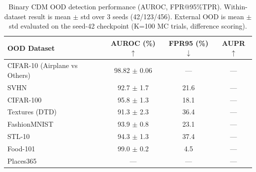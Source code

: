 \begin{table}[htbp]
    \centering
    \caption{Binary CDM OOD detection performance (AUROC, FPR@95\%TPR).
             Within-dataset result is mean $\pm$ std over 3 seeds (42/123/456).
             External OOD is mean $\pm$ std evaluated on the seed-42 checkpoint
             (K=100 MC trials, difference scoring).}
    \label{tab:main-results}
    \begin{tabular}{lccc}
        \toprule
        OOD Dataset & AUROC (\%)$\uparrow$ & FPR95 (\%)$\downarrow$ & AUPR$\uparrow$ \\
        \midrule
        CIFAR-10 (Airplane vs Others) & 98.82 $\pm$ 0.06 & — & — \\
        SVHN & 92.7 $\pm$ 1.7 & 21.6 & — \\
        CIFAR-100 & 95.8 $\pm$ 1.3 & 18.1 & — \\
        Textures (DTD) & 91.3 $\pm$ 2.3 & 36.4 & — \\
        FashionMNIST & 93.9 $\pm$ 0.8 & 23.1 & — \\
        STL-10 & 94.3 $\pm$ 1.3 & 37.4 & — \\
        Food-101 & 99.0 $\pm$ 0.2 & 4.5 & — \\
        Places365 & — & — & — \\
        \bottomrule
    \end{tabular}
\end{table}
